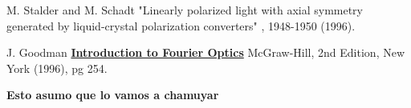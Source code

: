 \documentclass[twoside]{article}
\begin{document}
\begin{multicols}{2}
\begin{thebibliography}{99}
M. Stalder and M. Schadt
\newblock "Linearly polarized light with axial symmetry generated by liquid-crystal polarization converters" 
, 1948-1950 (1996).
 
 J. Goodman
\newblock \underline{\textbf{Introduction to Fourier Optics}} 
\newblock McGraw-Hill, 2nd Edition, New York (1996), pg 254.
 
\textbf{Esto asumo que lo vamos a chamuyar} 
  
\end{thebibliography}


\end{multicols}
\end{document}
